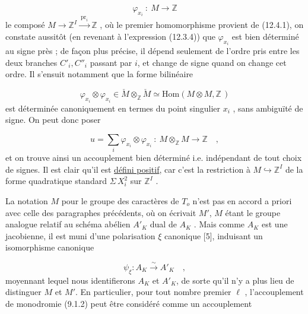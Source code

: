\begin{equation}\tag{12.4.3}
\varphi_{x_i} \ : \ M \longrightarrow \mathbb{Z}
\end{equation}
le composé $M \longrightarrow \mathbb{Z}^{I} \xrightarrow{\ \mathrm{pr}_i\ } \mathbb{Z}$ , où le premier homomorphisme provient de (12.4.1), on constate aussitôt (en revenant à l'expression (12.3.4)) que $\varphi_{x_i}$ est bien déterminé au signe près ; de façon plus précise, il dépend seulement de l'ordre pris entre les deux branches $C'_i,C''_i$ passant par $i$, et change de signe quand on change cet ordre. Il s'ensuit notamment que la forme bilinéaire

\begin{equation}\tag{12.4.4}
\varphi_{x_i} \otimes \varphi_{x_i} \in \check{M} \otimes_{\mathbb{Z}} \check{M} \simeq \mathrm{Hom}(M \otimes M, \mathbb{Z}\,)
\end{equation}
est déterminée canoniquement en termes du point singulier $x_i$ , sans ambiguïté de signe. On peut donc poser

\begin{equation}\tag{12.4.5}
u = \sum_{i} \varphi_{x_i} \otimes \varphi_{x_i} \ : \ M \otimes_{\mathbb{Z}} M \longrightarrow \mathbb{Z} \quad ,
\end{equation}
et on trouve ainsi un accouplement bien déterminé i.e. indépendant de tout choix de signes. Il est clair qu'il est \underline{défini positif}, car c'est la restriction à $M \hookrightarrow \mathbb{Z}^{I}$ de la forme quadratique standard $\Sigma\, X_i^2$ sur $\mathbb{Z}^{I}$ .



La notation $M$ pour le groupe des caractères de $T_o$ n'est pas en accord a priori avec celle des paragraphes précédents, où on écrivait $M'$, $M$ étant le groupe analogue relatif au schéma abélien $A'_K$ dual de $A_K$ . Mais comme $A_K$ est une jacobienne, il est muni d'une polarisation $\xi$ canonique [5\hspace{2.5em}], induisant un isomorphisme canonique

\begin{equation}\tag{12.4.6}
\psi_{\xi} : A_K \overset{\sim}{\longrightarrow} A'_K \quad ,
\end{equation}
moyennant lequel nous identifierons $A_K$ et $A'_K$, de sorte qu'il n'y a plus lieu de distinguer $M$ et $M'$. En particulier, pour tout nombre premier $\ell$ , l'accouplement de monodromie (9.1.2) peut être considéré comme un accouplement

